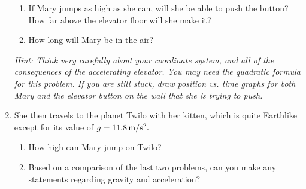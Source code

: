 \documentclass[12pt]{article}
\begin{document}
\begin{enumerate}
\begin{enumerate}
\item If Mary jumps as high as she can, will she be able to push the button? How far above the elevator floor will she make it?
\item How long will Mary be in the air?
\end{enumerate}

{\it Hint: Think very carefully about your coordinate system, and all of the consequences of the accelerating elevator. You may need the quadratic formula for this problem. If you are still stuck, draw position vs. time graphs for 
		both Mary and the elevator button on the wall that she is trying to push.}


\item She then travels to the planet Twilo with her kitten, which is quite Earthlike except for its value of $g=11.8\, \rm m/\rm s^2.$

\begin{enumerate}
\item How high can Mary jump on Twilo?
\item Based on a comparison of the last two problems, can you make any statements regarding gravity and acceleration?
\end{enumerate}

%
%


\bigskip


%
%
%
%
%



\end{enumerate}
\end{document}
